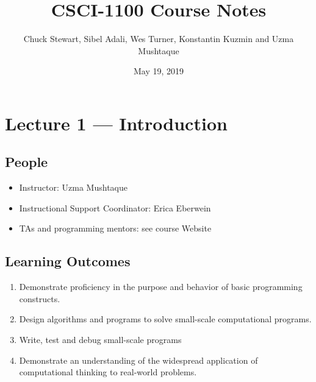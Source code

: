 \documentclass[letterpaper,10pt,english]{sphinxmanual}
\title{CSCI-1100 Course Notes}
\date{May 19, 2019}
\author{Chuck Stewart, Sibel Adali, Wes Turner, Konstantin Kuzmin and Uzma Mushtaque}
\begin{document}
\pagestyle{empty}
\sphinxmaketitle
\pagestyle{plain}
\sphinxtableofcontents
\pagestyle{normal}
\label{\detokenize{lecture_notes::doc}}



\chapter{Lecture 1 — Introduction}
\label{\detokenize{lecture_notes/lec01_intro:lecture-1-introduction}}\label{\detokenize{lecture_notes/lec01_intro::doc}}

\section{People}
\label{\detokenize{lecture_notes/lec01_intro:people}}\begin{itemize}
\item {} 
Instructor: Uzma Mushtaque

\item {} 
Instructional Support Coordinator: Erica Eberwein

\item {} 
TAs and programming mentors:  see course Website

\end{itemize}


\section{Learning Outcomes}
\label{\detokenize{lecture_notes/lec01_intro:learning-outcomes}}\begin{enumerate}
\def\theenumi{\arabic{enumi}}
\def\labelenumi{\theenumi .}
\makeatletter\def\p@enumii{\p@enumi \theenumi .}\makeatother
\item {} 
Demonstrate proficiency in the purpose and behavior of basic
programming constructs.

\item {} 
Design algorithms and programs to solve small-scale computational
programs.

\item {} 
Write, test and debug small-scale programs

\item {} 
Demonstrate an understanding of the widespread application of
computational thinking to real-world problems.

\end{enumerate}
\end{document}
